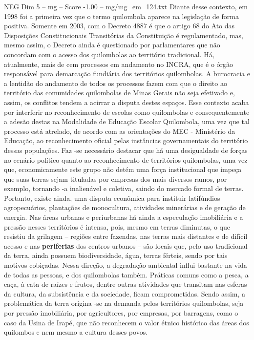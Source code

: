 \begin{textsample}{NEG Dim 5 – mg – Score -1.00 – mg/mg\_em\_124.txt}
Diante desse contexto, em 1998 foi a primeira vez que o termo quilombola aparece na legislação de forma positiva.
Somente em 2003, com o Decreto 4887 é que o artigo 68 do Ato das Disposições Constitucionais Transitórias da Constituição é regulamentado, mas, mesmo assim, o Decreto ainda é questionado por parlamentares que não concordam com o acesso dos quilombolas ao território tradicional.
Há, atualmente, mais de cem processos em andamento no INCRA, que é o órgão responsável para demarcação fundiária dos territórios quilombolas.
A burocracia e a lentidão do andamento de todos os processos fazem com que o direito ao território das comunidades quilombolas de Minas Gerais não seja efetivado e, assim, os conflitos tendem a acirrar a disputa destes espaços.
Esse contexto acaba por interferir no reconhecimento de escolas como quilombolas e consequentemente a adesão destas na Modalidade de Educação Escolar Quilombola, uma vez que tal processo está atrelado, de acordo com as orientações do MEC - Ministério da Educação, ao reconhecimento oficial pelas instâncias governamentais do território dessas populações.
Faz -se necessário destacar que há uma desigualdade de forças no cenário político quanto ao reconhecimento de territórios quilombolas, uma vez que, economicamente este grupo não detém uma força institucional que impeça que suas terras sejam tituladas por empresas dos mais diversos ramos, por exemplo, tornando -a inalienável e coletiva, saindo do mercado formal de terras.
Portanto, existe ainda, uma disputa econômica para instituir latifúndios agropecuários, plantações de monocultura, atividades minerárias e de geração de energia.
Nas áreas urbanas e periurbanas há ainda a especulação imobiliária e a pressão nesses territórios é intensa, pois, mesmo em terras diminutas, o que resistiu da grilagem – regiões entre fazendas, nas terras mais distantes e de difícil acesso e nas \textbf{periferias} dos centros urbanos – são locais que, pelo uso tradicional da terra, ainda possuem biodiversidade, água, terras férteis, sendo por tais motivos cobiçadas.
Nessa direção, a degradação ambiental influi bastante na vida de todas as pessoas, e dos quilombolas também.
Práticas comuns como a pesca, a caça, à cata de raízes e frutos, dentre outras atividades que transitam nas esferas da cultura, da subsistência e da sociedade, ficam comprometidas.
Sendo assim, a problemática da terra origina -se na demanda pelos territórios quilombolas, seja por pressão imobiliária, por agricultores, por empresas, por barragens, como o caso da Usina de Irapé, que não reconhecem o valor étnico histórico das áreas dos quilombos e nem mesmo a cultura desses povos.

\end{textsample}
